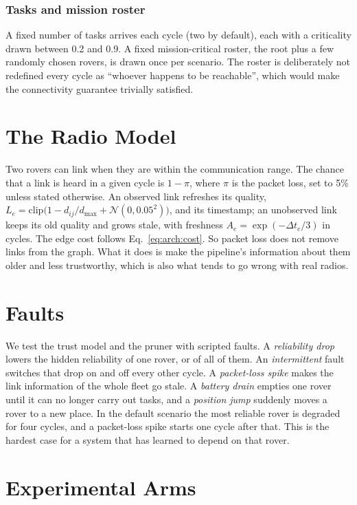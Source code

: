 \subsubsection{Tasks and mission roster} A fixed number of tasks arrives
each cycle (two by default), each with a criticality drawn between 0.2 and
0.9. A fixed mission-critical roster, the root plus a few randomly chosen
rovers, is drawn once per scenario. The roster is deliberately not redefined
every cycle as ``whoever happens to be reachable'', which would make the
connectivity guarantee trivially satisfied.

\section{The Radio Model}

Two rovers can link when they are within the communication range. The chance
that a link is heard in a given cycle is $1-\pi$, where $\pi$ is the packet
loss, set to 5\% unless stated otherwise. An observed link refreshes its quality,
$L_e=\mathrm{clip}\bigl(1-d_{ij}/d_{\max}+\mathcal N(0,0.05^2)\bigr)$, and its
timestamp; an unobserved link keeps its old quality and grows stale, with
freshness $A_e=\exp(-\Delta t_e/3)$ in cycles. The edge cost follows
Eq.~\eqref{eq:arch:cost}. So packet loss does not remove links from the
graph. What it does is make the pipeline's information about them older and
less trustworthy, which is also what tends to go wrong with real radios.

\section{Faults}

We test the trust model and the pruner with scripted faults. A
\emph{reliability drop} lowers the hidden reliability of one rover, or of all
of them. An \emph{intermittent} fault switches that drop on and off every
other cycle. A \emph{packet-loss spike} makes the link information of the
whole fleet go stale. A \emph{battery drain} empties one rover until it can no
longer carry out tasks, and a \emph{position jump} suddenly moves a rover to a
new place. In the default scenario the most reliable rover is degraded for
four cycles, and a packet-loss spike starts one cycle after that. This is the
hardest case for a system that has learned to depend on that rover.



\section{Experimental Arms}

